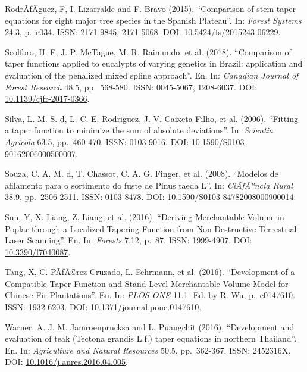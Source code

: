 \documentclass[]{article}
\begin{document}
RodrÃƒÂ­guez, F, I. Lizarralde and F. Bravo (2015). ``Comparison of stem
taper equations for eight major tree species in the Spanish Plateau''.
In: \emph{Forest Systems} 24.3, p.~e034. ISSN: 2171-9845, 2171-5068.
DOI:
\href{https://doi.org/10.5424/fs/2015243-06229}{10.5424/fs/2015243-06229}.

Scolforo, H. F, J. P. McTague, M. R. Raimundo, et al. (2018).
``Comparison of taper functions applied to eucalypts of varying genetics
in Brazil: application and evaluation of the penalized mixed spline
approach''. En. In: \emph{Canadian Journal of Forest Research} 48.5,
pp.~568-580. ISSN: 0045-5067, 1208-6037. DOI:
\href{https://doi.org/10.1139/cjfr-2017-0366}{10.1139/cjfr-2017-0366}.

Silva, L. M. S. d, L. C. E. Rodriguez, J. V. Caixeta Filho, et al.
(2006). ``Fitting a taper function to minimize the sum of absolute
deviations''. In: \emph{Scientia Agricola} 63.5, pp.~460-470. ISSN:
0103-9016. DOI:
\href{https://doi.org/10.1590/S0103-90162006000500007}{10.1590/S0103-90162006000500007}.

Souza, C. A. M. d, T. Chassot, C. A. G. Finger, et al. (2008). ``Modelos
de afilamento para o sortimento do fuste de Pinus taeda L''. In:
\emph{CiÃƒÂªncia Rural} 38.9, pp.~2506-2511. ISSN: 0103-8478. DOI:
\href{https://doi.org/10.1590/S0103-84782008000900014}{10.1590/S0103-84782008000900014}.

Sun, Y, X. Liang, Z. Liang, et al. (2016). ``Deriving Merchantable
Volume in Poplar through a Localized Tapering Function from
Non-Destructive Terrestrial Laser Scanning''. En. In: \emph{Forests}
7.12, p.~87. ISSN: 1999-4907. DOI:
\href{https://doi.org/10.3390/f7040087}{10.3390/f7040087}.

Tang, X, C. PÃƒÂ©rez-Cruzado, L. Fehrmann, et al. (2016). ``Development
of a Compatible Taper Function and Stand-Level Merchantable Volume Model
for Chinese Fir Plantations''. En. In: \emph{PLOS ONE} 11.1. Ed. by R.
Wu, p.~e0147610. ISSN: 1932-6203. DOI:
\href{https://doi.org/10.1371/journal.pone.0147610}{10.1371/journal.pone.0147610}.

Warner, A. J, M. Jamroenprucksa and L. Puangchit (2016). ``Development
and evaluation of teak (Tectona grandis L.f.) taper equations in
northern Thailand''. En. In: \emph{Agriculture and Natural Resources}
50.5, pp.~362-367. ISSN: 2452316X. DOI:
\href{https://doi.org/10.1016/j.anres.2016.04.005}{10.1016/j.anres.2016.04.005}.
\end{document}
